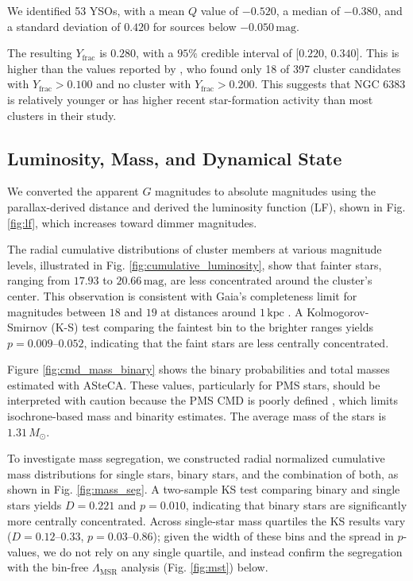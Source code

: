 \documentclass{aa}
\begin{document}
We identified 53 YSOs, with a mean $ Q $ value of $-0.520$, a median of $-0.380$, and a standard deviation of $0.420$ for sources below $-0.050\,\mathrm{mag}$.

The resulting $ Y_{\text{frac}} $ is $0.280$, with a $95\%$ credible interval of [$0.220$, $0.340$]. This is higher than the values reported by \citet{2013MNRAS.436.1465B}, who found only 18 of 397 cluster candidates with $ Y_{\text{frac}} > 0.100 $ and no cluster with $ Y_{\text{frac}} > 0.200 $. This suggests that NGC 6383 is relatively younger or has higher recent star-formation activity than most clusters in their study.

\subsection{Luminosity, Mass, and Dynamical State}\label{subsec:lum_mass_dyn}

We converted the apparent $G$ magnitudes to absolute magnitudes using the parallax-derived distance and derived the luminosity function (LF), shown in Fig. \ref{fig:lf}, which increases toward dimmer magnitudes.

The radial cumulative distributions of cluster members at various magnitude levels, illustrated in Fig. \ref{fig:cumulative_luminosity}, show that fainter stars, ranging from $17.93$ to $20.66\,\mathrm{mag}$, are less concentrated around the cluster's center. This observation is consistent with Gaia's completeness limit for magnitudes between $18$ and $19$ at distances around $1\,\mathrm{kpc}$ \citep{2020MNRAS.497.4246B,2023AA...677A..37C}. A Kolmogorov-Smirnov (K-S) test comparing the faintest bin to the brighter ranges yields $p=0.009$--$0.052$, indicating that the faint stars are less centrally concentrated.

Figure \ref{fig:cmd_mass_binary} shows the binary probabilities and total masses estimated with ASteCA. These values, particularly for PMS stars, should be interpreted with caution because the PMS CMD is poorly defined \citep{2010ApJ...723..166D}, which limits isochrone-based mass and binarity estimates. The average mass of the stars is $1.31\,M_\odot$. 

To investigate mass segregation, we constructed radial normalized cumulative mass distributions for single stars, binary stars, and the combination of both, as shown in Fig. \ref{fig:mass_seg}. A two-sample KS test comparing binary and single stars yields $D=0.221$ and $p=0.010$, indicating that binary stars are significantly more centrally concentrated. Across single-star mass quartiles the KS results vary ($D=0.12$--$0.33$, $p=0.03$--$0.86$); given the width of these bins and the spread in $p$-values, we do not rely on any single quartile, and instead confirm the segregation with the bin-free $\Lambda_{\mathrm{MSR}}$ analysis (Fig. \ref{fig:mst}) below.
\end{document}

